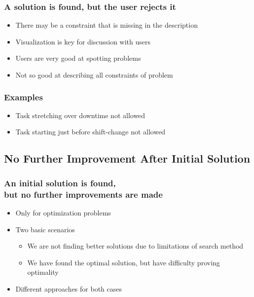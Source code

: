 \documentclass[dvipsnames,aspectratio=169]{beamer}
\begin{document}
\begin{frame}
\frametitle{A solution is found, but the user rejects it}
\begin{itemize}
\item There may be a constraint that is missing in the description
\item Visualization is key for discussion with users
\item Users are very good at spotting problems
\item Not so good at describing all constraints of problem 
\end{itemize}
\end{frame}

\begin{frame}
  \frametitle{Examples}
  \begin{itemize}
  \item Task stretching over downtime not allowed
  \item Task starting just before shift-change not allowed
  \end{itemize}
\end{frame}

\subsection{No Further Improvement After Initial Solution}

\begin{frame}
  \frametitle{An initial solution is found,\\ but no further improvements are made}
  \begin{itemize}
  \item Only for optimization problems
  \item Two basic scenarios
  \begin{itemize}
      \item We are not finding better solutions due to limitations of search method
      \item We have found the optimal solution, but have difficulty proving optimality
  \end{itemize}
  \item Different approaches for both cases
  \end{itemize}
  \end{frame}
  
\end{document}
